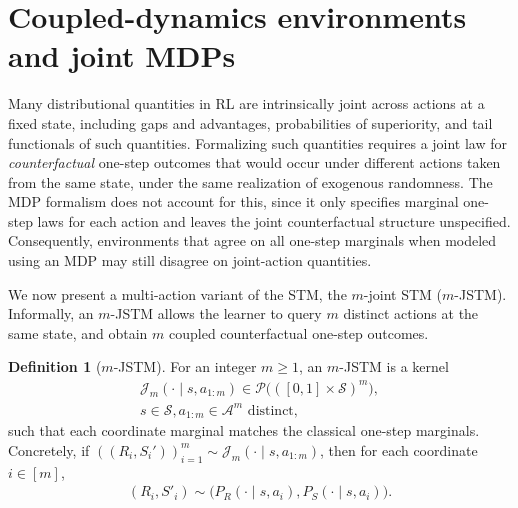 \documentclass[accepted]{uai2026}
\theoremstyle{plain}
\theoremstyle{definition}
\newtheorem{definition}[theorem]{Definition}
\theoremstyle{remark}
\newcommand{\A}{\mathcal{A}}
\newcommand{\Ss}{\mathcal{S}}
\newcommand{\1}{\mathbbm{1}}
\begin{document}
\section{Coupled-dynamics environments and joint MDPs}
Many distributional quantities in RL are intrinsically joint across actions at a fixed state, including gaps and advantages, probabilities of superiority, and tail functionals of such quantities. Formalizing such quantities requires a joint law for \textit{counterfactual} one-step outcomes that would occur under different actions taken from the same state, under the same realization of exogenous randomness. The MDP formalism does not account for this, since it only specifies marginal one-step laws for each action and leaves the joint counterfactual structure unspecified. Consequently, environments that agree on all one-step marginals when modeled using an MDP may still disagree on joint-action quantities.

We now present a multi-action variant of the STM, the $m$-joint STM ($m$-JSTM). Informally, an $m$-JSTM allows the learner to query $m$ distinct actions at the same state, and obtain $m$ coupled counterfactual one-step outcomes.
\begin{definition}[$m$-JSTM]\label{def:jstm} For an integer $m\ge 1$, an $m$-JSTM is a kernel 
\begin{equation}
\begin{gathered}
\mathcal{J}_m(\cdot \mid s, a_{1:m}) \in \mathcal{P}\big(([0, 1] \times \Ss)^m\big),\\ s\in\Ss, a_{1:m}
\in \A^m \text{ distinct},
\end{gathered}
\end{equation}
such that each coordinate marginal matches the classical one-step marginals. Concretely, if $((R_i, S_i'))_{i=1}^m \sim \mathcal{J
}_m(\cdot \mid s, a_{1:m})$, then for each coordinate $i \in [m]$,
\begin{equation}
\begin{gathered}
(R_i, S'_i) \sim \big(P_R(\cdot \mid s, a_i), P_S(\cdot \mid s, a_i) \big).
\end{gathered}
\end{equation}
\end{definition}
\end{document}
